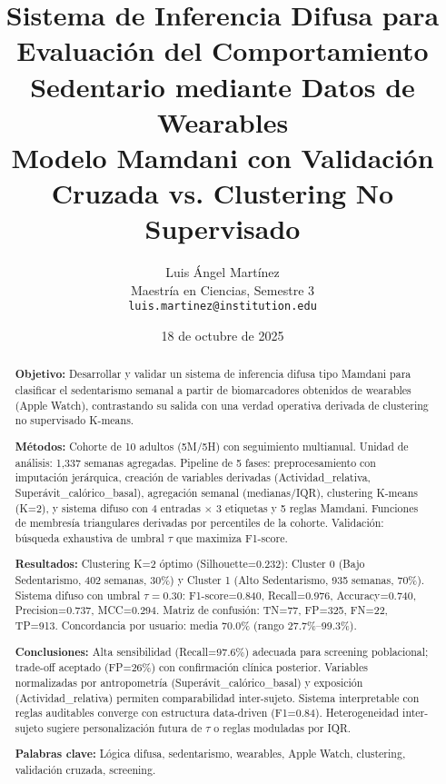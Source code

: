 \documentclass[12pt,a4paper,twoside]{article}
\title{
    \textbf{Sistema de Inferencia Difusa para Evaluación del Comportamiento Sedentario mediante Datos de Wearables}\\
    \vspace{0.5cm}
    \large Modelo Mamdani con Validación Cruzada vs. Clustering No Supervisado
}
\author{
    Luis Ángel Martínez\\
    \small Maestría en Ciencias, Semestre 3\\
    \small \texttt{luis.martinez@institution.edu}
}
\date{18 de octubre de 2025}
\begin{document}
\maketitle
\thispagestyle{empty}


\begin{abstract}
\noindent
\textbf{Objetivo:} Desarrollar y validar un sistema de inferencia difusa tipo Mamdani para clasificar el sedentarismo semanal a partir de biomarcadores obtenidos de wearables (Apple Watch), contrastando su salida con una verdad operativa derivada de clustering no supervisado K-means.

\textbf{Métodos:} Cohorte de 10 adultos (5M/5H) con seguimiento multianual. Unidad de análisis: 1,337 semanas agregadas. Pipeline de 5 fases: preprocesamiento con imputación jerárquica, creación de variables derivadas (Actividad\_relativa, Superávit\_calórico\_basal), agregación semanal (medianas/IQR), clustering K-means (K=2), y sistema difuso con 4 entradas $\times$ 3 etiquetas y 5 reglas Mamdani. Funciones de membresía triangulares derivadas por percentiles de la cohorte. Validación: búsqueda exhaustiva de umbral $\tau$ que maximiza F1-score.

\textbf{Resultados:} Clustering K=2 óptimo (Silhouette=0.232): Cluster 0 (Bajo Sedentarismo, 402 semanas, 30\%) y Cluster 1 (Alto Sedentarismo, 935 semanas, 70\%). Sistema difuso con umbral $\tau=0.30$: F1-score=0.840, Recall=0.976, Accuracy=0.740, Precision=0.737, MCC=0.294. Matriz de confusión: TN=77, FP=325, FN=22, TP=913. Concordancia por usuario: media 70.0\% (rango 27.7\%--99.3\%).

\textbf{Conclusiones:} Alta sensibilidad (Recall=97.6\%) adecuada para screening poblacional; trade-off aceptado (FP=26\%) con confirmación clínica posterior. Variables normalizadas por antropometría (Superávit\_calórico\_basal) y exposición (Actividad\_relativa) permiten comparabilidad inter-sujeto. Sistema interpretable con reglas auditables converge con estructura data-driven (F1=0.84). Heterogeneidad inter-sujeto sugiere personalización futura de $\tau$ o reglas moduladas por IQR.

\textbf{Palabras clave:} Lógica difusa, sedentarismo, wearables, Apple Watch, clustering, validación cruzada, screening.
\end{abstract}
\end{document}
